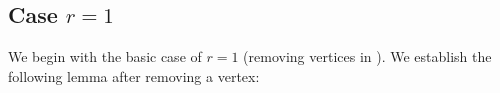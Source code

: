 


\subsection{Case $r=1$} 
\label{sec:r1}
We begin with the basic case of $r=1$ (removing vertices in \cpi). We establish the following lemma after removing a vertex:

